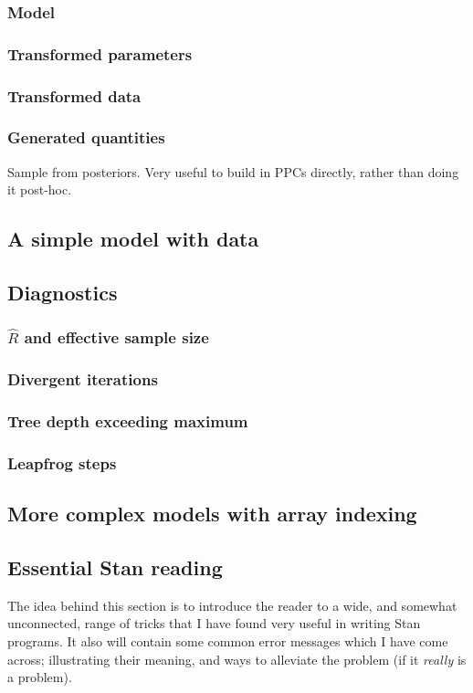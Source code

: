 \documentclass[11pt,fullpage]{book}
\begin{document}
\subsubsection{Model}
\subsubsection{Transformed parameters}
\subsubsection{Transformed data}
\subsubsection{Generated quantities}
Sample from posteriors. Very useful to build in PPCs directly, rather than doing it post-hoc.

\subsection{A simple model with data}

\subsection{Diagnostics}
\subsubsection{$\hat{R}$ and effective sample size}
\subsubsection{Divergent iterations}
\subsubsection{Tree depth exceeding maximum}
\subsubsection{Leapfrog steps}

\subsection{More complex models with array indexing}

\subsection{Essential Stan reading}
The idea behind this section is to introduce the reader to a wide, and somewhat unconnected, range of tricks that I have found very useful in writing Stan programs. It also will contain some common error messages which I have come across; illustrating their meaning, and ways to alleviate the problem (if it \textit{really} is a problem).
\end{document}
